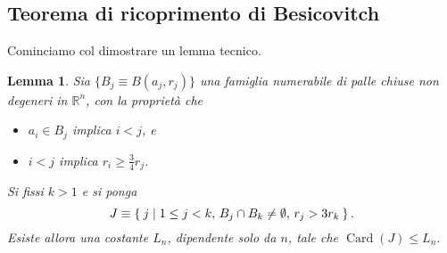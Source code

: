 \documentclass[a4paper,10pt,openright,oneside]{book}
\theoremstyle{theoremstyle}
\newtheorem{lemma}[teorema]{Lemma}
\theoremstyle{theoremstylewoheader}
\theoremstyle{theoremstyle}
\theoremstyle{proofsecstyle}
\theoremstyle{nonumberplain}
\newcommand{\RR}{\ensuremath{\mathbb{R}}}
\DeclareMathOperator{\Card}{Card}
\begin{document}
\subsection{Teorema di ricoprimento di Besicovitch}

Cominciamo col dimostrare un lemma tecnico.

\begin{lemma}
\label{lem:ricoprimento_besicovitch}
Sia $\{B_j \equiv B(a_j, r_j)\}$ una famiglia numerabile di palle chiuse non degeneri in $\RR^n$, con la proprietà che
\begin{itemize}
\item[($\alpha$)] $a_i \in B_j$ implica $i < j$, e
\item[($\beta$)] $i < j$ implica $r_i \ge \frac{3}{4} r_j$.
\end{itemize}
Si fissi $k > 1$ e si ponga
\[
J \equiv \Set{ j | 1 \le j < k,\, B_j \cap B_k \ne \emptyset,\, r_j > 3r_k }.
\]
Esiste allora una costante $L_n$, dipendente solo da $n$, tale che $\Card(J) \le L_n$.
\end{lemma}
\end{document}
